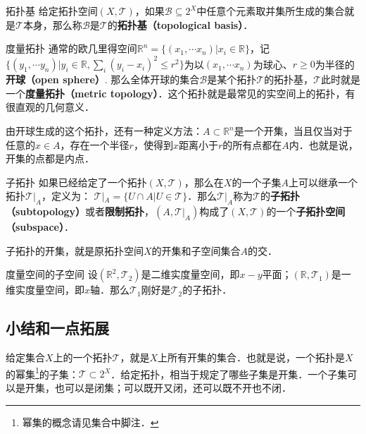\begin{definition}{拓扑基}\label{Topol_def2}
给定拓扑空间$(X, \mathcal{T})$，如果$\mathcal{B}\subseteq 2^X$中任意个元素取并集所生成的集合就是$\mathcal{T}$本身，那么称$\mathcal{B}$是$\mathcal{T}$的\textbf{拓扑基（topological basis）}．
\end{definition}

\begin{example}{度量拓扑}
通常的欧几里得空间$\mathbb{R}^n=\{(x_1, \cdots x_n)|x_i\in \mathbb{R}\}$，记$\{(y_1, \cdots y_n)|y_i\in \mathbb{R}, \sum_i(y_i-x_i)^2\leq r^2\}$为以$(x_1, \cdots x_n)$为球心、$r\geqslant 0$为半径的\textbf{开球（open sphere）}. 那么全体开球的集合$\mathcal{B}$是某个拓扑$\mathcal{T}$的拓扑基，$\mathcal{T}$此时就是一个\textbf{度量拓扑（metric topology）}．这个拓扑就是最常见的实空间上的拓扑，有很直观的几何意义．

由开球生成的这个拓扑，还有一种定义方法：$A\subset \mathbb{R}^n$是一个开集，当且仅当对于任意的$x\in A$，存在一个半径$r$，使得到$x$距离小于$r$的所有点都在$A$内．也就是说，开集的点都是内点．
\end{example}


\begin{definition}{子拓扑}\label{Topol_def3}
如果已经给定了一个拓扑$(X, \mathcal{T})$，那么在$X$的一个子集$A$上可以继承一个拓扑$\mathcal{T}|_A$，定义为：
$\mathcal{T}|_A=\{U\cap A|U\in \mathcal{T}\}$．那么$\mathcal{T}|_A$称为$\mathcal{T}$的\textbf{子拓扑（subtopology）}或者\textbf{限制拓扑}，$(A, \mathcal{T}|_A)$构成了$(X, \mathcal{T})$的一个\textbf{子拓扑空间（subspace）}．
\end{definition}

子拓扑的开集，就是原拓扑空间$X$的开集和子空间集合$A$的交．

\begin{example}{度量空间的子空间}
设$(\mathbb{R}^2, \mathcal{T}_2)$是二维实度量空间，即$x-y$平面；$(\mathbb{R}, \mathcal{T}_1)$是一维实度量空间，即$x$轴．那么$\mathcal{T}_1$刚好是$\mathcal{T}_2$的子拓扑．
\end{example}

\subsection{小结和一点拓展}

给定集合$X$上的一个拓扑$\mathcal{T}$，就是$X$上所有开集的集合．也就是说，一个拓扑是$X$的幂集\footnote{幂集的概念请见集合中脚注．}的子集：$\mathcal{T}\subset 2^X$．给定拓扑，相当于规定了哪些子集是开集．一个子集可以是开集，也可以是闭集；可以既开又闭，还可以既不开也不闭．

